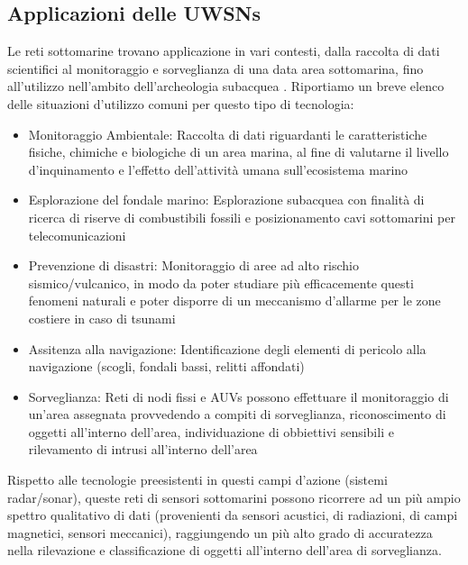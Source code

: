 \documentclass[Lau,binding=0.6cm]{sapthesis}
\begin{document}
\subsection{Applicazioni delle UWSNs}
Le reti sottomarine trovano applicazione in vari contesti, dalla raccolta di dati scientifici al monitoraggio e sorveglianza di una data area sottomarina, fino all'utilizzo nell'ambito dell'archeologia subacquea \cite{underwater}.\newline
Riportiamo un breve elenco delle situazioni d'utilizzo comuni per questo tipo di tecnologia:\newline
\begin{itemize}
\item Monitoraggio Ambientale:  \newline
Raccolta di dati riguardanti le caratteristiche fisiche, chimiche e biologiche di un area marina, al fine di valutarne il livello d'inquinamento e l'effetto dell'attività umana sull'ecosistema marino\newline
\item Esplorazione del fondale marino: \newline
Esplorazione subacquea con finalità di ricerca di riserve di combustibili fossili e posizionamento cavi sottomarini per telecomunicazioni\newline
\item Prevenzione di disastri:\newline
Monitoraggio di aree ad alto rischio sismico/vulcanico, in modo da poter studiare più efficacemente questi fenomeni naturali e poter disporre di un meccanismo d'allarme per le zone costiere in caso di tsunami\newline
\item Assitenza alla navigazione: \newline
Identificazione degli elementi di pericolo alla navigazione (scogli, fondali bassi, relitti affondati)\newline
\item Sorveglianza:\newline
Reti di nodi fissi e AUVs possono effettuare il monitoraggio di un'area assegnata provvedendo a compiti di sorveglianza, riconoscimento di oggetti all'interno dell'area, individuazione di obbiettivi sensibili e rilevamento di intrusi all'interno dell'area
\end{itemize}
Rispetto alle tecnologie preesistenti in questi campi d'azione (sistemi radar/sonar), queste reti di sensori sottomarini possono ricorrere ad un più ampio spettro qualitativo di dati (provenienti da sensori acustici, di radiazioni, di campi magnetici, sensori meccanici), raggiungendo un più alto grado di accuratezza nella rilevazione e classificazione di oggetti all'interno dell'area di sorveglianza.\newline
\end{document}
